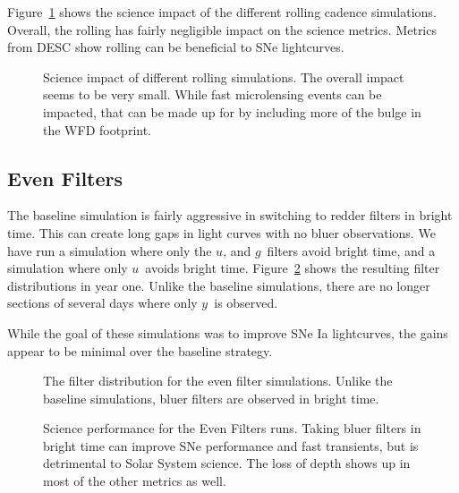 Figure~\ref{fig:rolling_radar} shows the science impact of the different rolling cadence simulations. Overall, the rolling has fairly negligible impact on the science metrics. Metrics from DESC show rolling can be beneficial to SNe lightcurves. 

\begin{figure}
\caption{Science impact of different rolling simulations. The overall impact seems to be very small. While fast microlensing events can be impacted, that can be made up for by including more of the bulge in the WFD footprint. }\label{fig:rolling_radar}
\end{figure}


\subsection{Even Filters}

The baseline simulation is fairly aggressive in switching to redder filters in bright time. This can create long gaps in light curves with no bluer observations. We have run a simulation where only the $u$, and $g$\ filters avoid bright time, and a simulation where only $u$\ avoids bright time. Figure~\ref{fig:even_filt_hourglass} shows the resulting filter distributions in year one. Unlike the baseline simulations, there are no longer sections of several days where only $y$\ is observed.

While the goal of these simulations was to improve SNe Ia lightcurves, the gains appear to be minimal over the baseline strategy.


\begin{figure}
\label{fig:even_filt_hourglass}
\caption{The filter distribution for the even filter simulations. Unlike the baseline simulations, bluer filters are observed in bright time.}
\end{figure}



\begin{figure}
\caption{Science performance for the Even Filters runs.  Taking bluer filters in bright time can improve SNe performance and fast transients, but is detrimental to Solar System science.  The loss of depth shows up in most of the other metrics as well.}\label{fig:even_filt_radar}
\end{figure}



